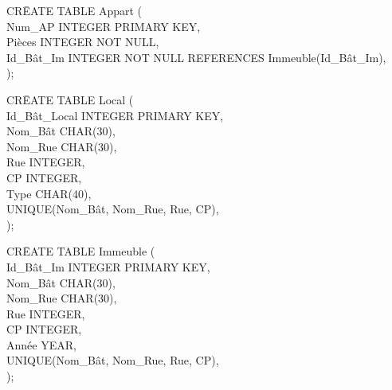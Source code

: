 \documentclass[a4paper,10.5pt]{report}
\begin{document}
		\begin{tabbing}
			CR\=EATE TABLE Appart (\\
			\> Num\_AP INTEGER PRIMARY KEY,\\
			\> Pièces INTEGER NOT NULL,\\
			\> Id\_Bât\_Im INTEGER NOT NULL REFERENCES Immeuble(Id\_Bât\_Im),\\);
		\end{tabbing}
                                                   
		\begin{tabbing}
			CR\=EATE TABLE Local (\\
			\> Id\_Bât\_Local INTEGER PRIMARY KEY,\\
			\> Nom\_Bât CHAR(30),\\
			\> Nom\_Rue CHAR(30),\\
			\> Rue INTEGER,\\
			\> CP INTEGER,\\
			\> Type CHAR(40),\\
			\> UNIQUE(Nom\_Bât, Nom\_Rue, Rue, CP),\\);
		\end{tabbing}
		\begin{tabbing}
			CR\=EATE TABLE Immeuble (\\
			\> Id\_Bât\_Im INTEGER PRIMARY KEY,\\
			\> Nom\_Bât CHAR(30),\\
			\> Nom\_Rue CHAR(30),\\
			\> Rue INTEGER,\\
			\> CP INTEGER,\\
			\> Année YEAR,\\
			\> UNIQUE(Nom\_Bât, Nom\_Rue, Rue, CP),\\);
		\end{tabbing}
\end{document}
